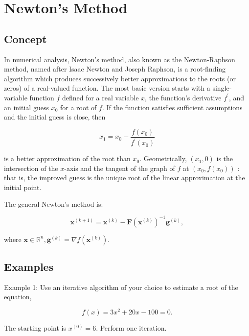 \section{Newton's Method}

\subsection{Concept}
In numerical analysis, Newton's method, also known as the Newton-Raphson method, named after Isaac Newton and Joseph Raphson, is a root-finding algorithm which produces successively better approximations to the roots (or zeros) of a real-valued function. The most basic version starts with a single-variable function \(f\) defined for a real variable \(x\), the function's derivative \(f^{\prime}\), and an initial guess \(x_{0}\) for a root of \(f\). If the function satisfies sufficient assumptions and the initial guess is close, then

\[
	x_{1}=x_{0}-\frac{f\left(x_{0}\right)}{f^{\prime}\left(x_{0}\right)}
\]

is a better approximation of the root than \(x_{0}\). Geometrically, \(\left(x_{1}, 0\right)\) is the intersection of the \(x\)-axis and the tangent of the graph of \(f\) at \(\left(x_{0}, f\left(x_{0}\right)\right)\) : that is, the improved guess is the unique root of the linear approximation at the initial point.

The general Newton's method is:

\[
	\boldsymbol{x}^{(k+1)}=\boldsymbol{x}^{(k)}-\boldsymbol{F}\left(\boldsymbol{x}^{(k)}\right)^{-1} \boldsymbol{g}^{(k)},
\]

where \(\boldsymbol{x} \in \mathbb{R}^{n}, \boldsymbol{g}^{(k)}=\nabla f\left(\boldsymbol{x}^{(k)}\right)\).

\subsection{Examples}
Example 1: Use an iterative algorithm of your choice to estimate a root of the equation,

\[
	f(x)=3 x^{2}+20 x-100=0 .
\]

The starting point is \(x^{(0)}=6\). Perform one iteration.

